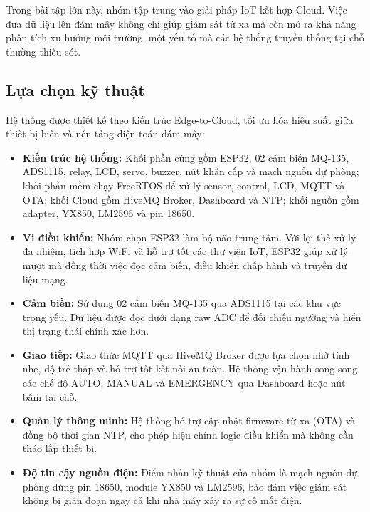 \documentclass[../BTL_PTIT.tex]{subfiles}
\begin{document}
Trong bài tập lớn này, nhóm tập trung vào giải pháp IoT kết hợp Cloud. Việc đưa dữ liệu lên đám mây không chỉ giúp giám sát từ xa mà còn mở ra khả năng phân tích xu hướng môi trường, một yếu tố mà các hệ thống truyền thống tại chỗ thường thiếu sót.

\subsection{Lựa chọn kỹ thuật}
Hệ thống được thiết kế theo kiến trúc Edge-to-Cloud, tối ưu hóa hiệu suất giữa thiết bị biên và nền tảng điện toán đám mây:

\begin{itemize}[label=\textbullet]
    \item \textbf{Kiến trúc hệ thống:} Khối phần cứng gồm ESP32, 02 cảm biến MQ-135, ADS1115, relay, LCD, servo, buzzer, nút khẩn cấp và mạch nguồn dự phòng; khối phần mềm chạy FreeRTOS để xử lý sensor, control, LCD, MQTT và OTA; khối Cloud gồm HiveMQ Broker, Dashboard và NTP; khối nguồn gồm adapter, YX850, LM2596 và pin 18650.
	\item \textbf{Vi điều khiển:} Nhóm chọn ESP32 làm bộ não trung tâm. Với lợi thế xử lý đa nhiệm, tích hợp WiFi và hỗ trợ tốt các thư viện IoT, ESP32 giúp xử lý mượt mà đồng thời việc đọc cảm biến, điều khiển chấp hành và truyền dữ liệu mạng.
	\item \textbf{Cảm biến:} Sử dụng 02 cảm biến MQ-135 qua ADS1115 tại các khu vực trọng yếu. Dữ liệu được đọc dưới dạng raw ADC để đối chiếu ngưỡng và hiển thị trạng thái chính xác hơn.
	\item \textbf{Giao tiếp:} Giao thức MQTT qua HiveMQ Broker được lựa chọn nhờ tính nhẹ, độ trễ thấp và hỗ trợ tốt kết nối an toàn. Hệ thống vận hành song song các chế độ AUTO, MANUAL và EMERGENCY qua Dashboard hoặc nút bấm tại chỗ.
	\item \textbf{Quản lý thông minh:} Hệ thống hỗ trợ cập nhật firmware từ xa (OTA) và đồng bộ thời gian NTP, cho phép hiệu chỉnh logic điều khiển mà không cần tháo lắp thiết bị.
	\item \textbf{Độ tin cậy nguồn điện:} Điểm nhấn kỹ thuật của nhóm là mạch nguồn dự phòng dùng pin 18650, module YX850 và LM2596, bảo đảm việc giám sát không bị gián đoạn ngay cả khi nhà máy xảy ra sự cố mất điện.
\end{itemize}
\end{document}
